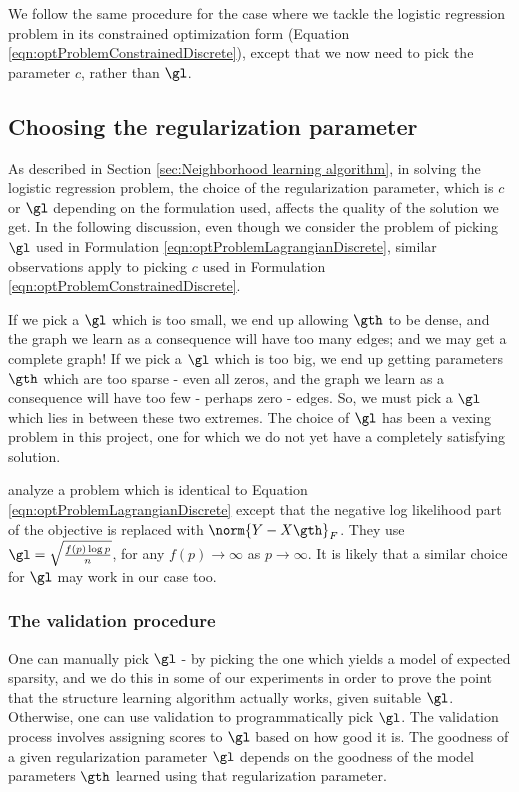 \documentclass{article}
\begin{document}
We follow the same procedure for the case where we tackle the logistic regression problem in its constrained optimization form (Equation \ref{eqn:optProblemConstrainedDiscrete}), except that we now need to pick the parameter $c$, rather than $\gl$.

\subsection{Choosing the regularization parameter}
As described in Section \ref{sec:Neighborhood learning algorithm}, in solving the logistic regression problem, the choice of the regularization parameter, which is $c$ or $\gl$ depending on the formulation used, affects the quality of the solution we get. In the following discussion, even though we consider the problem of picking $\gl$ used in Formulation \ref{eqn:optProblemLagrangianDiscrete}, similar observations apply to picking $c$ used in Formulation \ref{eqn:optProblemConstrainedDiscrete}.

If we pick a $\gl$ which is too small, we end up allowing $\gth$ to be dense, and the graph we learn as a consequence will have too many edges; and we may get a complete graph! If we pick a $\gl$ which is too big, we end up getting parameters $\gth$ which are too sparse - even all zeros, and the graph we learn as a consequence will have too few - perhaps zero - edges. So, we must pick a $\gl$ which lies in between these two extremes. The choice of $\gl$ has been a vexing problem in this project, one for which we do not yet have a completely satisfying solution.

\citet{ObozinskiWJ08arxiv} analyze a problem which is identical to Equation \ref{eqn:optProblemLagrangianDiscrete} except that the negative log likelihood part of the objective is replaced with $\norm{Y-X\gth}_F $. They use $\gl = \sqrt{\frac{f(p) \log p}{n}}$, for any $f(p) \to \infty$ as $p \to \infty$. It is likely that a similar choice for $\gl$ may work in our case too.

\subsubsection{The validation procedure}
\label{sec:The validation procedure.}
One can manually pick $\gl$ - by picking the one which yields a model of expected sparsity, and we do this in some of our experiments in order to prove the point that the structure learning algorithm actually works, given suitable $\gl$. Otherwise, one can use validation to programmatically pick $\gl$. The validation process involves assigning scores to $\gl$ based on how good it is. The goodness of a given regularization parameter $\gl$ depends on the goodness of the model parameters $\gth$ learned using that regularization parameter.
\end{document}
